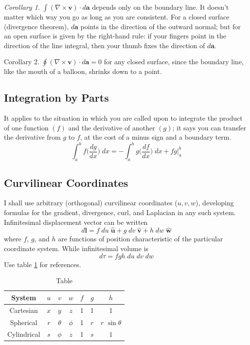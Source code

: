 \documentclass[../main.tex]{subfiles}
\begin{document}
\emph{Corollary 1.} $\int (\nabla \times \mathbf{v})\cdot d\mathbf{a}$ depends only on the boundary line. It doesn't matter which way you go as long as you are consistent. For a closed surface (divergence theorem), $d\mathbf{a}$ points in the direction of the outward normal; but for an open surface is given by the right-hand rule: if your ﬁngers point in the direction of the line integral, then your thumb ﬁxes the direction of $d\mathbf{a}$.

Corollary 2. $\oint (\nabla \times \mathbf{v})\cdot d\mathbf{a}=0$ for any closed surface, since the boundary line, like the mouth of a balloon, shrinks down to a point.

\subsection*{Integration by Parts}
It applies to the situation in which you are called upon to integrate the product of one function $( f )$ and the derivative of another $(g)$; it says you can transfer the derivative from $g$ to $f$, at the cost of a minus sign and a boundary term.
\begin{equation*}
    \int_{a}^{b} f\bigg(\frac{dg}{dx}\bigg)\;dx=-\int_{a}^{b} g\bigg(\frac{df}{dx}\bigg)\;dx+ fg \bigg\lvert_{a}^{b}
\end{equation*}

\subsection*{Curvilinear Coordinates}
I shall use arbitrary (orthogonal) curvilinear coordinates ($u, v, w$), developing formulas for the gradient, divergence, curl, and Laplacian in any such system. Infinitesimal displacement vector can be written
\begin{equation*}
    d\mathbf{l}=f\;d u \;\mathbf{\hat{u}} +g \;d v \;\mathbf{\hat{v}}+h \;d w \;\mathbf{\hat{w}}
\end{equation*}
where $f$, $g$, and $h$ are functions of position characteristic of the particular coordinate system. While infinitesimal volume is
\begin{equation*}
    d\tau=fgh\; du \;dv \;dw
\end{equation*}
Use table \ref{T1} for references.

\begin{table}
    \centering
    \caption{Table}
    \begin{tabular}{c c c c c c c } 
        \toprule
        System&$u$&$v$&$w$&$f$&$g$&$h$\\
        \midrule
        Cartesian&$x$&$y$&$z$&1&1&1\\
        Spherical&$r$&$\theta$&$\phi$&1&$r$&$r$ $\sin \theta$\\
        Cylindrical&$s$&$\phi$&$z$&1&$s$&$1$\\
        \bottomrule
    \end{tabular}
    \label{T1}
\end{table}
\end{document}
